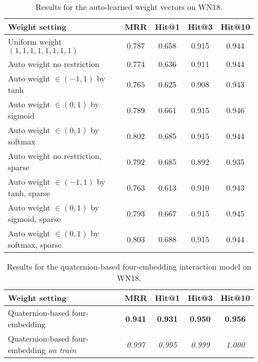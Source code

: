 \documentclass[sigconf,edbt]{acmart-edbt2019}
\begin{document}
\begin{table*}[ht]
\centering
	
	\caption{Results for the auto-learned weight vectors on WN18.}
	\label{tab:result_learnweight}
	
	\begin{tabular}{l|c|c|c|c}
		\hline 
		\textbf{Weight setting} & \textbf{MRR} & \textbf{Hit@1} & \textbf{Hit@3} & \textbf{Hit@10}\\ 
		\hline
		
		Uniform weight $ (1, 1, 1, 1, 1, 1, 1, 1) $ & 0.787 & 0.658 & 0.915 & 0.944\\ 
		\hline
		
		Auto weight no restriction & 0.774 & 0.636 & 0.911 & 0.944\\ 
		Auto weight $ \in (-1, 1) $ by tanh & 0.765 & 0.625 & 0.908 & 0.943\\ 
		Auto weight $ \in (0, 1) $ by sigmoid & 0.789 & 0.661 & 0.915 & 0.946\\ 
		Auto weight $ \in (0, 1) $ by softmax & 0.802 & 0.685 & 0.915 & 0.944\\ 
		Auto weight no restriction, sparse & 0.792 & 0.685 & 0.892 & 0.935\\ 
		Auto weight $ \in (-1, 1) $ by tanh, sparse & 0.763 & 0.613 & 0.910 & 0.943\\ 
		Auto weight $ \in (0, 1) $ by sigmoid, sparse & 0.793 & 0.667 & 0.915 & 0.945\\ 
		Auto weight $ \in (0, 1) $ by softmax, sparse & 0.803 & 0.688 & 0.915 & 0.944\\ 
		\hline 
	\end{tabular}
\end{table*}

\begin{table*}[ht]
\centering
	
	\caption{Results for the quaternion-based four-embedding interaction model on WN18.}
	\label{tab:result_quaternion}
	
	\begin{tabular}{l|c|c|c|c}
		\hline 
		\textbf{Weight setting} & \textbf{MRR} & \textbf{Hit@1} & \textbf{Hit@3} & \textbf{Hit@10}\\ 
		\hline
		
		Quaternion-based four-embedding & \textbf{0.941} & \textbf{0.931} & \textbf{0.950} & \textbf{0.956}\\ 
		Quaternion-based four-embedding \textit{on train} & \textit{0.997} & \textit{0.995} & \textit{0.999} & \textit{1.000}\\ 
		\hline 
	\end{tabular}
\end{table*}
\end{document}
